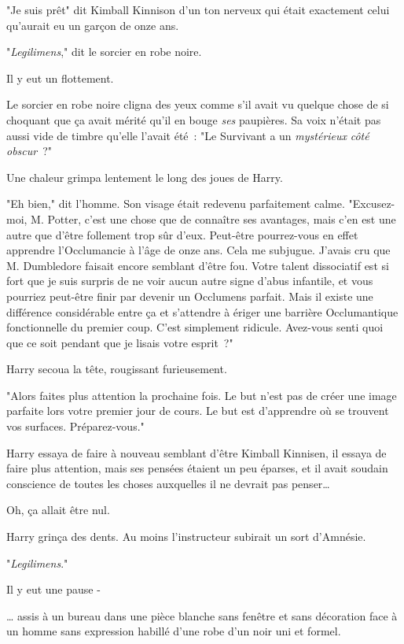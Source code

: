 "Je suis prêt" dit Kimball Kinnison d'un ton nerveux qui était exactement celui qu'aurait eu un garçon de onze ans.

"\emph{Legilimens}," dit le sorcier en robe noire.

Il y eut un flottement.

Le sorcier en robe noire cligna des yeux comme s'il avait vu quelque chose de si choquant que ça avait mérité qu'il en bouge \emph{ses} paupières. Sa voix n'était pas aussi vide de timbre qu'elle l'avait été~: "Le Survivant a un \emph{mystérieux} \emph{côté obscur}~?"

Une chaleur grimpa lentement le long des joues de Harry.

"Eh bien," dit l'homme. Son visage était redevenu parfaitement calme. "Excusez-moi, M. Potter, c'est une chose que de connaître ses avantages, mais c'en est une autre que d'être follement trop sûr d'eux. Peut-être pourrez-vous en effet apprendre l'Occlumancie à l'âge de onze ans. Cela me subjugue. J'avais cru que M. Dumbledore faisait encore semblant d'être fou. Votre talent dissociatif est si fort que je suis surpris de ne voir aucun autre signe d'abus infantile, et vous pourriez peut-être finir par devenir un Occlumens parfait. Mais il existe une différence considérable entre ça et s'attendre à ériger une barrière Occlumantique fonctionnelle du premier coup. C'est simplement ridicule. Avez-vous senti quoi que ce soit pendant que je lisais votre esprit~?"

Harry secoua la tête, rougissant furieusement.

"Alors faites plus attention la prochaine fois. Le but n'est pas de créer une image parfaite lors votre premier jour de cours. Le but est d'apprendre où se trouvent vos surfaces. Préparez-vous."

Harry essaya de faire à nouveau semblant d'être Kimball Kinnisen, il essaya de faire plus attention, mais ses pensées étaient un peu éparses, et il avait soudain conscience de toutes les choses auxquelles il ne devrait pas penser…

Oh, ça allait être nul.

Harry grinça des dents. Au moins l'instructeur subirait un sort d'Amnésie.

"\emph{Legilimens}."

Il y eut une pause -

… assis à un bureau dans une pièce blanche sans fenêtre et sans décoration face à un homme sans expression habillé d’une robe d'un noir uni et formel.

